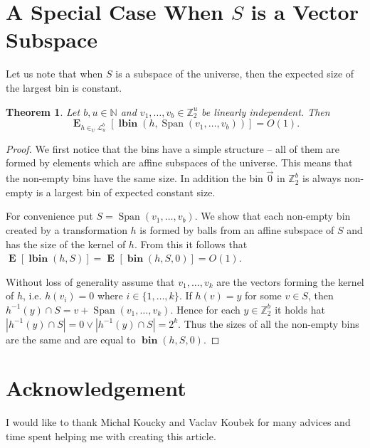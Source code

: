 \documentclass{article}
\newcommand{\bin}[3]{\operatorname{\mathbf{bin}}({#1}, {#2}, {#3})}
\newcommand{\lbin}[2]{\operatorname{\mathbf{lbin}}({#1}, {#2})}
\newcommand{\vecspace}[2]{\mathbb{Z}_{#1}^{#2}}
\newcommand{\binvecspace}[1]{\vecspace{2}{#1}}
\newcommand{\linearmaps}[2]{\mathcal{L}_{#1}^{#2}}
\newcommand{\expects}[2]{\operatorname{\mathbf{E}}_{{#1}}\left[{#2}\right]}
\newcommand{\expect}[1]{\expects{}{#1}}
\newtheorem{theorem}{Theorem}
\begin{document}
\section{A Special Case When $S$ is a Vector Subspace}

Let us note that when $S$ is a subspace of the universe, then the expected size of the largest bin is constant.

\begin{theorem}
Let $b, u \in \mathbb{N}$ and $v_1, \dots, v_b \in \mathbb{Z}_2^u$ be linearly independent. Then \[ \expects{h \in_U \linearmaps{u}{b}}{\lbin{h}{\operatorname{Span}(v_1, \dots, v_b)}} = O(1) .\]
\end{theorem}
\begin{proof}
We first notice that the bins have a simple structure -- all of them are formed by elements which are affine subspaces of the universe.
This means that the non-empty bins have the same size.
In addition the bin $\vec{0}$ in $\binvecspace{b}$ is always non-empty is a largest bin of expected constant size.

For convenience put $S = \operatorname{Span}(v_1, \dots, v_b)$. 
We show that each non-empty bin created by a transformation $h$ is formed by balls from an affine subspace of $S$ and has the size of the kernel of $h$.
From this it follows that $\expect{\lbin{h}{S}} = \expect{\bin{h}{S}{0}} = O(1)$.

Without loss of generality assume that $v_1, \dots, v_k$ are the vectors forming the kernel of $h$, i.e. $h(v_i) = 0$ where $i \in \{1, \dots, k\}$.
If $h(v) = y$ for some $v \in S$, then $h^{-1}(y) \cap S = v + \operatorname{Span}(v_1, \dots, v_k)$.
Hence for each $y \in \mathbb{Z}_2^b$ it holds hat $|h^{-1}(y) \cap S| = 0 \vee |h^{-1}(y) \cap S| = 2^k$.
Thus the sizes of all the non-empty bins are the same and are equal to $\bin{h}{S}{0}$.
\end{proof}

\section{Acknowledgement}


I would like to thank Michal Koucky and Vaclav Koubek for many advices and  time spent helping me with creating this article.
\end{document}
